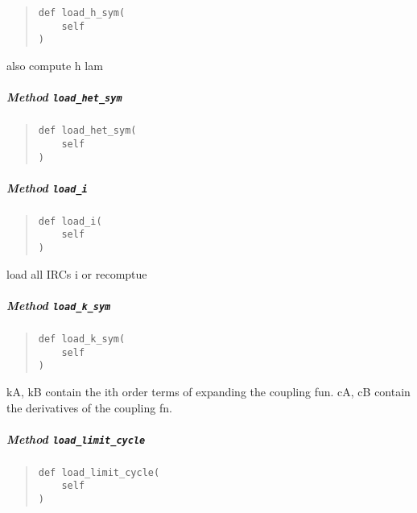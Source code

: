 \documentclass[english,a4paper,oneside]{article}
\let\oldsubparagraph\subparagraph
\renewcommand{\subparagraph}[1]{\oldsubparagraph{#1}\mbox{}}
\begin{document}
\begin{quote}
\begin{verbatim}
def load_h_sym(
    self
)
\end{verbatim}
\end{quote}

also compute h lam

\hypertarget{StrongCoupling.StrongCoupling.load_het_sym}{%
\subparagraph{\texorpdfstring{Method
\texttt{load\_het\_sym}}{Method load\_het\_sym}}\label{StrongCoupling.StrongCoupling.load_het_sym}}

\begin{quote}
\begin{verbatim}
def load_het_sym(
    self
)
\end{verbatim}
\end{quote}

\hypertarget{StrongCoupling.StrongCoupling.load_i}{%
\subparagraph{\texorpdfstring{Method
\texttt{load\_i}}{Method load\_i}}\label{StrongCoupling.StrongCoupling.load_i}}

\begin{quote}
\begin{verbatim}
def load_i(
    self
)
\end{verbatim}
\end{quote}

load all IRCs i or recomptue

\hypertarget{StrongCoupling.StrongCoupling.load_k_sym}{%
\subparagraph{\texorpdfstring{Method
\texttt{load\_k\_sym}}{Method load\_k\_sym}}\label{StrongCoupling.StrongCoupling.load_k_sym}}

\begin{quote}
\begin{verbatim}
def load_k_sym(
    self
)
\end{verbatim}
\end{quote}

kA, kB contain the ith order terms of expanding the coupling fun. cA, cB
contain the derivatives of the coupling fn.

\hypertarget{StrongCoupling.StrongCoupling.load_limit_cycle}{%
\subparagraph{\texorpdfstring{Method
\texttt{load\_limit\_cycle}}{Method load\_limit\_cycle}}\label{StrongCoupling.StrongCoupling.load_limit_cycle}}

\begin{quote}
\begin{verbatim}
def load_limit_cycle(
    self
)
\end{verbatim}
\end{quote}
\end{document}

